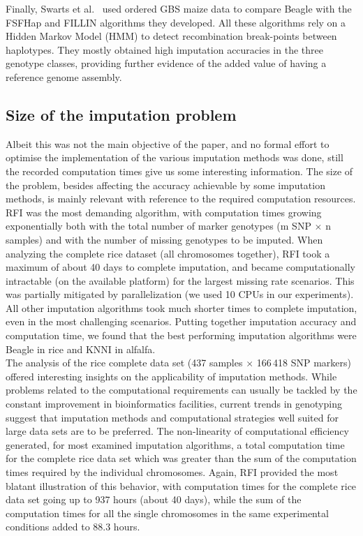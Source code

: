 Finally, Swarts et al.~\cite{swarts_novel_2014} used ordered GBS maize data to compare Beagle with the FSFHap and FILLIN algorithms they developed. All these algorithms rely on a Hidden Markov Model (HMM) to detect recombination break-points between haplotypes. They mostly obtained high imputation accuracies in the three genotype classes, providing further evidence of the added value of having a reference genome assembly.


\subsection{Size of the imputation problem}
\label{sec:size_of_problem}
Albeit this was not the main objective of the paper, and no formal effort to optimise the implementation of the various imputation methods was done, still the recorded computation times give us some interesting information.
The size of the problem, besides affecting the accuracy achievable by some imputation methods, is mainly relevant with reference to the required computation resources. RFI was the most demanding algorithm, with computation times growing exponentially both with the total number of marker genotypes (m SNP $\times$ n samples) and with the number of missing genotypes to be imputed. When analyzing the complete rice dataset (all chromosomes together), RFI took a maximum of about 40 days to complete imputation, and became computationally intractable (on the available platform) for the largest missing rate scenarios. This was partially mitigated by parallelization (we used 10 CPUs in our experiments). All other imputation algorithms took much shorter times to complete imputation, even in the most challenging scenarios. Putting together imputation accuracy and computation time, we found that the best performing imputation algorithms were Beagle in rice and KNNI in alfalfa.\\

The analysis of the rice complete data set (437 samples $\times$ 166\,418 SNP markers) offered interesting insights on the applicability of imputation methods. While problems related to the computational requirements can usually be tackled by the constant improvement in bioinformatics facilities, current trends in genotyping suggest that imputation methods and computational strategies well suited for large data sets are to be preferred. The non-linearity of computational efficiency generated, for most examined imputation algorithms, a total computation time for the complete rice data set which was greater than the sum of the computation times required by the individual chromosomes. Again, RFI provided the most blatant illustration of this behavior, with computation times for the complete rice data set going up to 937 hours (about 40 days), while the sum of the computation times for all the single chromosomes in the same experimental conditions added to 88.3 hours.
